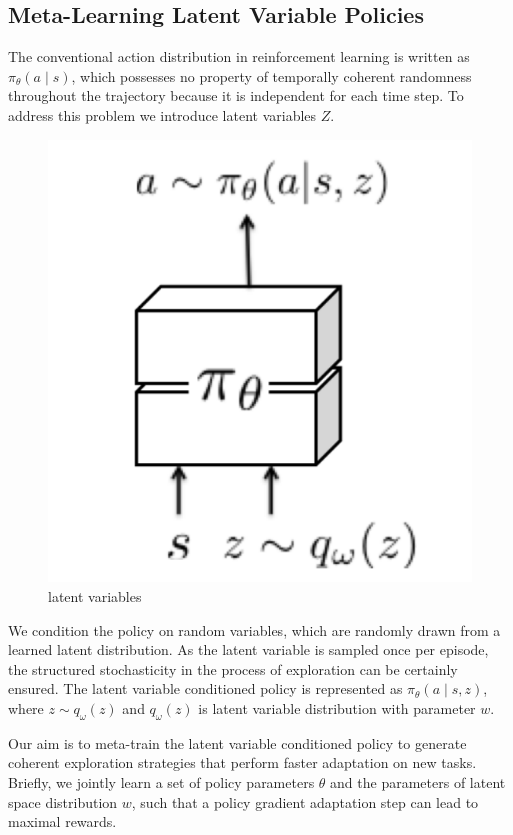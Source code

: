 \subsection{ Meta-Learning Latent Variable Policies}
The conventional action distribution in reinforcement learning is written as $\pi_{\theta}(a\mid s)$, which possesses no property of temporally coherent randomness throughout the trajectory because it is independent for each time step. To address this problem we introduce latent variables $Z$. 
\begin{figure}[H]
	\includegraphics[scale=0.6]{MAESN_01.PNG}
	\centering
	\caption{latent variables}
	\label{MAESN}
\end{figure}

 We condition the policy on random variables, which are randomly drawn from a learned latent distribution. As the latent variable is sampled once per episode, the structured stochasticity in the process of exploration can be certainly ensured. The latent variable conditioned policy is represented as $\pi_{\theta}(a \mid s, z)$, where $z \sim q_{\omega}(z)$ and $q_{\omega}(z)$ is latent variable distribution with parameter $w$. 

Our aim is to meta-train the latent variable conditioned policy to generate coherent exploration strategies that perform faster adaptation on new tasks. Briefly, we jointly learn a set of policy parameters $\theta$ and the parameters of latent space distribution $w$, such that a policy gradient adaptation step can lead to maximal rewards.

